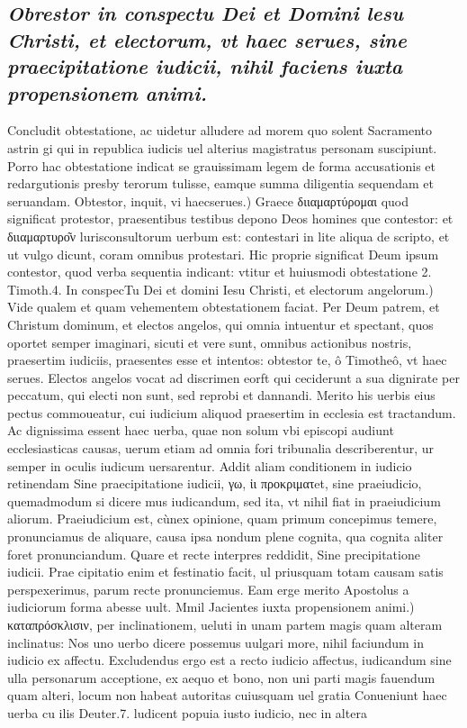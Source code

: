 \documentclass{article}
\begin{document}
\begin{pages}
\subsection*{\textit{Obrestor in conspectu Dei et Domini lesu Christi, et electorum, vt haec serues, sine praecipitatione iudicii, nihil faciens iuxta propensionem animi. }}\pstart Concludit obtestatione, ac uidetur alludere ad morem quo solent Sacramento astrin gi qui in republica iudicis uel alterius magistratus personam suscipiunt. Porro hac obtestatione indicat se grauissimam legem de forma accusationis et redargutionis presby terorum tulisse, eamque summa diligentia sequendam et seruandam.  \pend\pstart Obtestor, inquit, vi haecserues.) Graece διιαμαρτύρομαι quod significat protestor, praesentibus testibus depono Deos homines que contestor: et διιαμαρτυρο͂ν lurisconsultorum uerbum est: contestari in lite aliqua de scripto, et ut vulgo dicunt, coram omnibus protestari. Hic proprie significat Deum ipsum contestor, quod verba sequentia indicant: vtitur et huiusmodi obtestatione 2. Timoth.4.  \pend\pstart In conspecTu Dei et domini Iesu Christi, et electorum angelorum.) Vide qualem et quam vehementem obtestationem faciat. Per Deum patrem, et Christum dominum, et electos angelos, qui omnia intuentur et spectant, quos oportet semper imaginari, sicuti et vere sunt, omnibus actionibus nostris, praesertim iudiciis, praesentes esse et intentos: obtestor te, ô Timotheô, vt haec serues. Electos angelos vocat ad discrimen eorft qui ceciderunt a sua dignirate per peccatum, qui electi non sunt, sed reprobi et dannandi. Merito his uerbis eius pectus commoueatur, cui iudicium aliquod praesertim in ecclesia est tractandum. Ac dignissima essent haec uerba, quae non solum vbi episcopi audiunt ecclesiasticas causas, uerum etiam ad omnia fori tribunalia describerentur, ur semper in oculis iudicum uersarentur. Addit aliam conditionem in iudicio retinendam Sine praecipitatione iudicii, γω, ἰι προκριματet, sine praeiudicio, quemadmodum si dicere mus iudicandum, sed ita, vt nihil fiat in praeiudicium aliorum. Praeiudicium est, cùnex opinione, quam primum concepimus temere, pronunciamus de aliquare, causa ipsa nondum plene cognita, qua cognita aliter foret pronunciandum. Quare et recte interpres reddidit, Sine precipitatione iudicii. Prae cipitatio enim et festinatio facit, ul priusquam totam causam satis perspexerimus, parum recte pronunciemus. Eam erge merito Apostolus a iudiciorum forma abesse uult.  \pend\pstart Mmil Jacientes iuxta propensionem animi.) καταπρόσκλισιν, per inclinationem, ueluti in unam partem magis quam alteram inclinatus: Nos uno uerbo dicere possemus uulgari more, nihil faciundum in iudicio ex affectu. Excludendus ergo est a recto iudicio affectus, iudicandum sine ulla personarum acceptione, ex aequo et bono, non uni parti magis fauendum quam alteri, locum non habeat autoritas cuiusquam uel gratia Conueniunt haec uerba cu ilis Deuter.7. ludicent popuia iusto iudicio, nec in altera  \pend

\end{pages}
\end{document}
